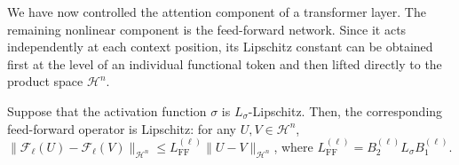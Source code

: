 We have now controlled the attention component of a transformer layer. The remaining nonlinear component is the feed-forward network. Since it acts independently at each context position, its Lipschitz constant can be obtained first at the level of an individual functional token and then lifted directly to the product space \(\mathcal H^n\).

\begin{lemma}
\label{lem:Lipschitz continuity of the feed-forward block}
Suppose that the activation function \(\sigma\) is \(L_\sigma\)-Lipschitz. Then, the corresponding feed-forward operator is Lipschitz: for any \(U,V\in\mathcal H^n\), \(\|\mathcal F_\ell(U)-\mathcal F_\ell(V)\|_{\mathcal H^n} \leqslant L_{\mathrm{FF}}^{(\ell)} \|U-V\|_{\mathcal H^n}\), where \(L_{\mathrm{FF}}^{(\ell)}=B_2^{(\ell)}L_\sigma B_1^{(\ell)}\).
\end{lemma}

